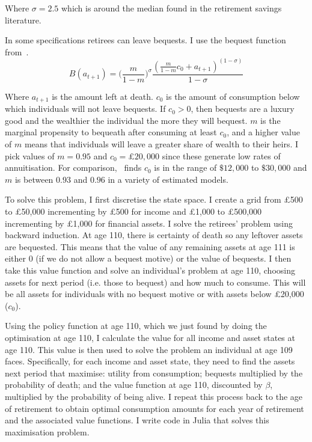 \documentclass[12pt]{article}
\begin{document}
Where $\sigma = 2.5$ which is around the median found in the retirement savings
literature.

In some specifications retirees can leave bequests. I use the bequest function
from~\cite{lockwood-red-2012,lockwood-aer-2018}.
\begin{equation*}
  \label{eq:bequest-function}
  B(a_{t+1}) = \bigl( \frac{m}{1 - m} \bigr)^{\sigma}  \frac{(\frac{m}{1 - m}c_{0} + a_{t+1})^{(1 - \sigma)}}{1 - \sigma}
\end{equation*}

Where $a_{t+1}$ is the amount left at death. $c_{0}$ is the amount of
consumption below which individuals will not leave bequests. If $c_{0} >0$, then
bequests are a luxury good and the wealthier the individual the more they will
bequest. $m$ is the marginal propensity to bequeath after consuming at least
$c_{0}$, and a higher value of $m$ means that individuals will leave a greater
share of wealth to their heirs. I pick values of $m = 0.95$ and $c_{0} = \pounds
  20,000$ since these generate low rates of annuitisation. For comparison,~\cite{lockwood-aer-2018} finds $c_{0}$ is in the range of $\$12,000$ to
$\$30,000$ and $m$ is between $0.93$ and $0.96$ in a variety of estimated
models.

To solve this problem, I first discretise the state space. I create a grid from £500
to £50,000 incrementing by £500 for income and £1,000 to £500,000 incrementing
by £1,000 for financial assets. I solve the retirees' problem using backward
induction. At age 110, there is certainty of death so any leftover assets are
bequested. This means that the value of any remaining assets at age 111 is either 0 (if we do
not allow a bequest motive) or the value of bequests. I then take this value
function and solve an individual's problem at age 110, choosing assets for next
period (i.e. those to bequest) and how much to consume. This will be all assets
for individuals with no bequest motive or with assets below £20,000 ($c_{0}$).

Using the policy function at age 110, which we just found by doing the
optimisation at age 110, I calculate the value for all income and asset states
at age 110. This value is then used to solve the problem an individual at age
109 faces. Specifically, for each income and asset state, they need to find the
assets next period that maximise: utility from consumption; bequests multiplied
by the probability of death; and the value function at age 110, discounted by
$\beta$, multiplied by the probability of being alive. I repeat this process
back to the age of retirement to obtain optimal consumption amounts for each
year of retirement and the associated value functions. I write code in Julia
that solves this maximisation problem.
\end{document}
